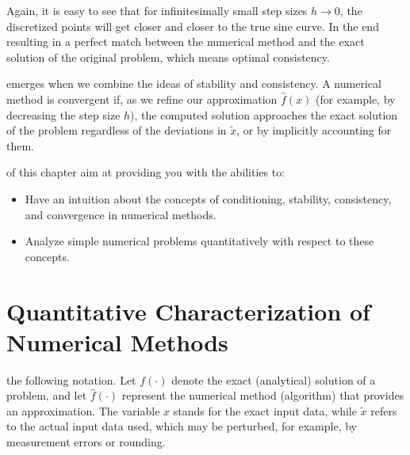 Again, it is easy to see that for infinitesimally small step sizes $h \to 0$, the discretized points will get closer and closer to the true sine curve.
In the end resulting in a perfect match between the numerical method and the exact solution of the original problem, which means optimal consistency.



 emerges when we combine the ideas of stability and consistency.
A numerical method is convergent if, as we refine our approximation $\hat{f}(x)$ (for example, by decreasing the step size $h$), 
the computed solution approaches the exact solution of the problem regardless of the deviations in $\tilde{x}$, or by implicitly accounting for them.



\vspace{2.5em}
 of this chapter aim at providing you with the abilities to:
\begin{itemize}
    \item Have an intuition about the concepts of conditioning, stability, consistency, and convergence in numerical methods.
    \item Analyze simple numerical problems quantitatively with respect to these concepts.
\end{itemize}



















\newpage





\newpage
\section{Quantitative Characterization of Numerical Methods}

 the following notation. Let $f(\cdot)$ denote the exact (analytical) solution of a problem,
and let $\hat{f}(\cdot)$ represent the numerical method (algorithm) that provides an approximation.
The variable $x$ stands for the exact input data, while $\tilde{x}$ refers to the actual input data used,
which may be perturbed, for example, by measurement errors or rounding.

